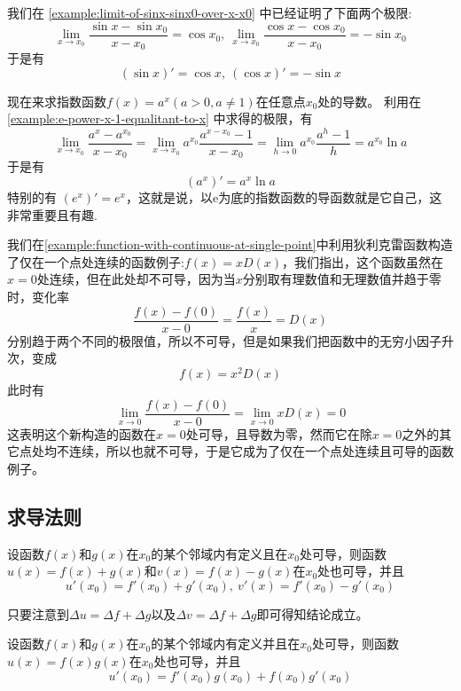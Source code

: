\begin{example}
 我们在 \autoref{example:limit-of-sinx-sinx0-over-x-x0} 中已经证明了下面两个极限:
  \[ \lim_{x \to x_0} \frac{\sin{x}-\sin{x_0}}{x-x_0} = \cos{x_0}, \  
   \lim_{x \to x_0} \frac{\cos{x}-\cos{x_0}}{x-x_0} = -\sin{x_0} \]
 于是有
 \[ (\sin{x})' = \cos{x}, \  (\cos{x})' = - \sin{x} \]
\end{example}

\begin{example}
  现在来求指数函数$f(x)=a^x(a>0,a\neq 1)$在任意点$x_0$处的导数。
  利用在 \autoref{example:e-power-x-1-equalitant-to-x} 中求得的极限，有
  \[ \lim_{x \to x_0} \frac{a^{x}-a^{x_0}}{x-x_0} = \lim_{x \to x_0} a^{x_0} \frac{a^{x-x_0}-1}{x-x_0} = \lim_{h \to 0} a^{x_0} \frac{a^h-1}{h} = a^{x_0} \ln{a} \]
  于是有
  \[ (a^x)' = a^x \ln{a} \]
  特别的有 $(e^x)'=e^x$，这就是说，以$\mathrm{e}$为底的指数函数的导函数就是它自己，这非常重要且有趣.
\end{example}

\begin{example}
  我们在\autoref{example:function-with-continuous-at-single-point}中利用狄利克雷函数构造了仅在一个点处连续的函数例子:$f(x)=xD(x)$，我们指出，这个函数虽然在$x=0$处连续，但在此处却不可导，因为当$x$分别取有理数值和无理数值并趋于零时，变化率
  \[ \frac{f(x)-f(0)}{x-0} = \frac{f(x)}{x} = D(x) \]
  分别趋于两个不同的极限值，所以不可导，但是如果我们把函数中的无穷小因子升次，变成
  \[ f(x)=x^2D(x) \]
  此时有
  \[ \lim_{x \to 0} \frac{f(x)-f(0)}{x-0} = \lim_{x \to 0} xD(x) = 0 \]
  这表明这个新构造的函数在$x=0$处可导，且导数为零，然而它在除$x=0$之外的其它点处均不连续，所以也就不可导，于是它成为了仅在一个点处连续且可导的函数例子。
\end{example}

\subsection{求导法则}
\label{sec:rule-of-derivative}

\begin{theorem}
  设函数$f(x)$和$g(x)$在$x_0$的某个邻域内有定义且在$x_0$处可导，则函数$u(x)=f(x)+g(x)$和$v(x)=f(x)-g(x)$在$x_0$处也可导，并且
  \[ u'(x_0)=f'(x_0)+g'(x_0), \  v'(x)=f'(x_0)-g'(x_0) \]
\end{theorem}

只要注意到$\Delta u=\Delta f+\Delta g$以及$\Delta v=\Delta f+ \Delta g$即可得知结论成立。

\begin{theorem}
  设函数$f(x)$和$g(x)$在$x_0$的某个邻域内有定义并且在$x_0$处可导，则函数$u(x)=f(x)g(x)$在$x_0$处也可导，并且
  \[ u'(x_0)=f'(x_0)g(x_0)+f(x_0)g'(x_0) \]
\end{theorem}

